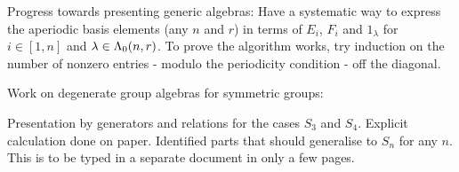 \documentclass[a4paper, 11pt]{report}
\begin{document}
Progress towards presenting generic algebras: Have a systematic way to express the aperiodic basis elements (any $n$ and $r$) in terms of $E_i$, $F_i$ and $1_\lambda$ for $i\in[1,n]$ and $\lambda\in\Lambda_0(n,r)$. To prove the algorithm works, try induction on the number of nonzero entries - modulo the periodicity condition - off the diagonal.

Work on degenerate group algebras for symmetric groups:

Presentation by generators and relations for the cases $S_3$ and $S_4$. Explicit calculation done on paper. Identified parts that should generalise to $S_n$ for any $n$. This is to be typed in a separate document in only a few pages.

 

\printbibliography
\end{document}
